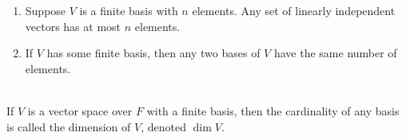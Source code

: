 \begin{corollary}
    \begin{enumerate}
        \item Suppose $V$ is a finite basis with $n$ elements. Any set of linearly independent vectors has at most $n$ elements.
        \item If $V$ has some finite basis, then any two bases of $V$ have the same number of elements.
    \end{enumerate}
\end{corollary}

\begin{definition} \leavevmode \\
    If $V$ is a vector space over $F$ with a finite basis, then the cardinality of any basis is called the dimension of $V$, denoted $\dim V$.
\end{definition}